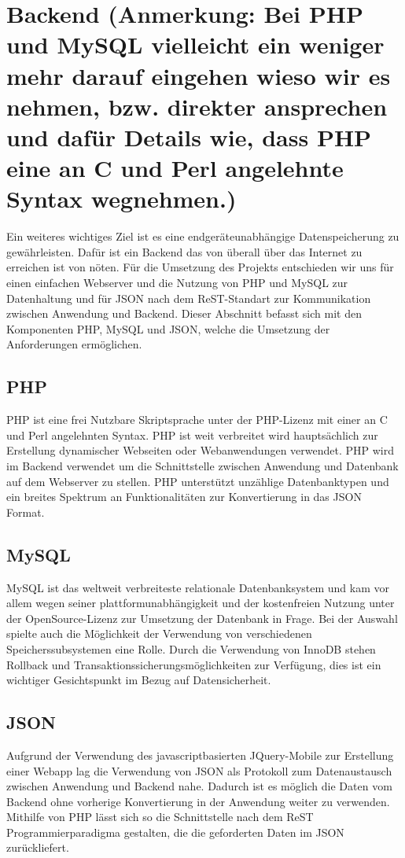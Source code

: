\documentclass[10pt, conference, compsocconf]{IEEEtran}
\begin{document}
\section{Backend (Anmerkung: Bei PHP und MySQL vielleicht ein weniger mehr darauf eingehen wieso wir es nehmen, bzw. direkter ansprechen und daf\"ur Details wie, dass PHP eine an C und Perl angelehnte Syntax wegnehmen.)}
Ein weiteres wichtiges Ziel ist es eine endger\"ateunabh\"angige Datenspeicherung zu gew\"ahrleisten. Daf\"ur ist ein Backend das von \"uberall \"uber das Internet zu erreichen ist von n\"oten. F\"ur die Umsetzung des Projekts entschieden wir uns f\"ur einen einfachen Webserver und die Nutzung von PHP und MySQL zur Datenhaltung und f\"ur JSON nach dem ReST-Standart zur Kommunikation zwischen Anwendung und Backend.  Dieser Abschnitt befasst sich mit den Komponenten PHP, MySQL und JSON, welche die Umsetzung der Anforderungen erm\"oglichen.

\subsection{PHP}
PHP ist eine frei Nutzbare Skriptsprache unter der PHP-Lizenz mit einer an C und Perl angelehnten Syntax. PHP ist weit verbreitet wird haupts\"achlich zur Erstellung dynamischer Webseiten oder Webanwendungen verwendet. PHP wird im Backend verwendet um die Schnittstelle zwischen Anwendung und Datenbank auf dem Webserver zu stellen. PHP unterst\"utzt unz\"ahlige Datenbanktypen und ein breites Spektrum an Funktionalit\"aten zur Konvertierung in das JSON Format.

\subsection{MySQL}
MySQL ist das weltweit verbreiteste relationale Datenbanksystem und kam vor allem wegen seiner plattformunabh\"angigkeit und der kostenfreien Nutzung unter der OpenSource-Lizenz zur Umsetzung der Datenbank in Frage. Bei der Auswahl spielte auch die M\"oglichkeit der Verwendung von verschiedenen Speicherssubsystemen eine Rolle. Durch die Verwendung von InnoDB stehen Rollback und Transaktionssicherungsm\"oglichkeiten zur Verf\"ugung, dies ist ein wichtiger Gesichtspunkt im Bezug auf Datensicherheit.

\subsection{JSON}
Aufgrund der Verwendung des javascriptbasierten JQuery-Mobile zur Erstellung einer Webapp lag die Verwendung von JSON als Protokoll zum Datenaustausch zwischen Anwendung und Backend nahe. Dadurch ist es m\"oglich die Daten vom Backend ohne vorherige Konvertierung in der Anwendung weiter zu verwenden. Mithilfe von PHP l\"asst sich so die Schnittstelle nach dem ReST Programmierparadigma gestalten, die die geforderten Daten im JSON zur\"uckliefert. 
\end{document}
